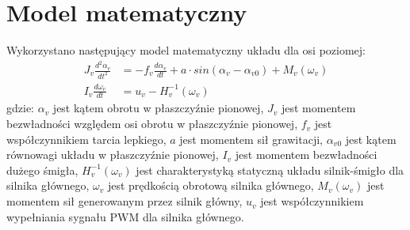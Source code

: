 \documentclass[11pt,a4paper]{article}
\begin{document}
\section{Model matematyczny}
\label{sec:modelmatematyczny}
Wykorzystano następujący model matematyczny układu dla osi poziomej:
\begin{equation}
\begin{aligned}
J_v \frac{d^2\alpha_v}{dt^2} &= -f_v\frac{d\alpha_v}{dt}+a\cdot sin(\alpha_v-\alpha_{v0})+M_v(\omega_v)\\
I_v\frac{d\omega_v}{dt} &= u_v - H_v^{-1}(\omega_v)
\end{aligned}
\label{eq:model_vertical}
\end{equation}
\noindent gdzie:\newline
\(\alpha_v\) jest kątem obrotu w płaszczyźnie pionowej,\newline
\(J_v\) jest momentem bezwładności względem osi obrotu w płaszczyźnie pionowej,\newline
\(f_v\) jest współczynnikiem tarcia lepkiego,\newline
\(a\) jest momentem sił grawitacji,\newline
\(\alpha_{v0}\) jest kątem równowagi układu w płaszczyźnie pionowej,\newline
\(I_v\) jest momentem bezwładności dużego śmigła,\newline
\(H_v^{-1}(\omega_v)\) jest charakterystyką statyczną układu silnik-śmigło dla silnika głównego,\newline
\(\omega_v\) jest prędkością obrotową silnika głównego,\newline
\(M_v(\omega_v)\) jest momentem sił generowanym przez silnik główny,\newline
\(u_v\) jest współczynnikiem wypełniania sygnału PWM dla silnika głównego.
\end{document}
